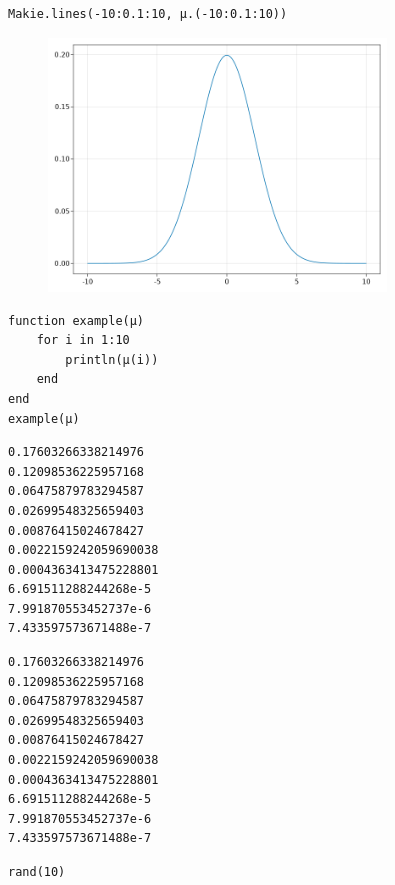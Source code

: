 \begin{lstlisting}[language=JuliaLocal, style=julia]
Makie.lines(-10:0.1:10, μ.(-10:0.1:10))
\end{lstlisting}

\begin{figure}[H]
	\centering
	\includegraphics[width=0.8\textwidth]{./figures/jupyternotebook_figure2.png}
	\label{fig:jupyternotebook_figure2.png}

\end{figure}

\begin{lstlisting}[language=JuliaLocal, style=julia]
function example(μ)
    for i in 1:10
        println(μ(i))
    end
end
example(μ)
\end{lstlisting}

\begin{verbatim}
0.17603266338214976
0.12098536225957168
0.06475879783294587
0.02699548325659403
0.00876415024678427
0.0022159242059690038
0.0004363413475228801
6.691511288244268e-5
7.991870553452737e-6
7.433597573671488e-7

\end{verbatim}

\begin{verbatim}
0.17603266338214976
0.12098536225957168
0.06475879783294587
0.02699548325659403
0.00876415024678427
0.0022159242059690038
0.0004363413475228801
6.691511288244268e-5
7.991870553452737e-6
7.433597573671488e-7

\end{verbatim}

\begin{lstlisting}[language=JuliaLocal, style=julia]
rand(10)
\end{lstlisting}

